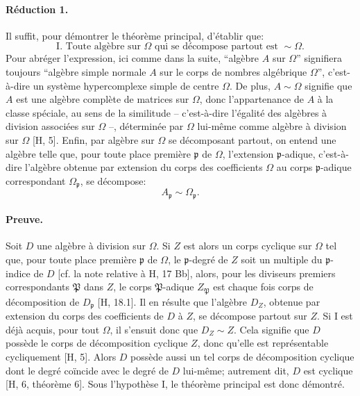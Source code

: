 \paragraph{Réduction 1.}
Il suffit, pour démontrer le théorème principal, d'établir que:
\[
\text{I. Toute algèbre sur }\Omega\text{ qui se décompose partout est } \sim \Omega .
\]
Pour abréger l'expression, ici comme dans la suite, ``algèbre \(A\) sur \(\Omega\)'' signifiera toujours ``algèbre simple normale \(A\) sur le corps de nombres algébrique \(\Omega\)'', c'est-à-dire un système hypercomplexe simple de centre \(\Omega\). De plus, \(A\sim\Omega\) signifie que \(A\) est une algèbre complète de matrices sur \(\Omega\), donc l'appartenance de \(A\) à la classe spéciale, au sens de la similitude -- c'est-à-dire l'égalité des algèbres à division associées sur \(\Omega\) --, déterminée par \(\Omega\) lui-même comme algèbre à division sur \(\Omega\) [H, 5]. Enfin, par algèbre sur \(\Omega\) se décomposant partout, on entend une algèbre telle que, pour toute place première \(\mathfrak p\) de \(\Omega\), l'extension \(\mathfrak p\)-adique, c'est-à-dire l'algèbre obtenue par extension du corps des coefficients \(\Omega\) au corps \(\mathfrak p\)-adique correspondant \(\Omega_{\mathfrak p}\), se décompose:
\[
A_{\mathfrak p}\sim \Omega_{\mathfrak p}.
\]

\paragraph{Preuve.}
Soit \(D\) une algèbre à division sur \(\Omega\). Si \(Z\) est alors un corps cyclique sur \(\Omega\) tel que, pour toute place première \(\mathfrak p\) de \(\Omega\), le \(\mathfrak p\)-degré de \(Z\) soit un multiple du \(\mathfrak p\)-indice de \(D\) [cf. la note relative à H, 17 Bb], alors, pour les diviseurs premiers correspondants \(\mathfrak P\) dans \(Z\), le corps \(\mathfrak P\)-adique \(Z_{\mathfrak P}\) est chaque fois corps de décomposition de \(D_{\mathfrak p}\) [H, 18.1]. Il en résulte que l'algèbre \(D_Z\), obtenue par extension du corps des coefficients de \(D\) à \(Z\), se décompose partout sur \(Z\). Si I est déjà acquis, pour tout \(\Omega\), il s'ensuit donc que \(D_Z\sim Z\). Cela signifie que \(D\) possède le corps de décomposition cyclique \(Z\), donc qu'elle est représentable cycliquement [H, 5]. Alors \(D\) possède aussi un tel corps de décomposition cyclique dont le degré coïncide avec le degré de \(D\) lui-même; autrement dit, \(D\) est cyclique [H, 6, théorème 6]. Sous l'hypothèse I, le théorème principal est donc démontré.


